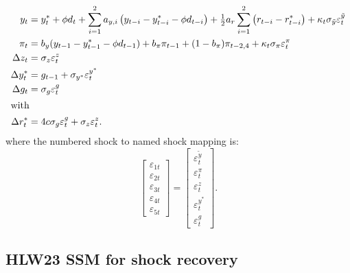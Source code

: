 \documentclass[a4paper,12pt]{article}
\newcommand{\bsq}{\begin{subequations}}\newcommand{\esq}{\end{subequations}}
\newcommand{\intxt}[1]{\intertext{#1}}\newcommand{\BAW}[1]{\begin{adjustwidth}{-#1mm}{-5mm}}\newcommand{\EAW}{\end{adjustwidth}}
\begin{document}
\bsq\label{LW03}%
\begin{align}
y_{t}& =y_{t}^{\ast }+\phi d_{t}+\sum_{i=1}^{2}a_{y,i}\left(
y_{t-i}-y_{t-i}^{\ast }-\phi d_{t-i}\right) +\tfrac{1}{2}a_{r}\sum_{i=1}^{2}%
\left( r_{t-i}-r_{t-i}^{\ast }\right) +\kappa _{t}\sigma _{\tilde{y}%
}\varepsilon _{t}^{\tilde{y}}  \label{LW03a} \\
\pi _{t}& =b_{y}(y_{t-1}-y_{t-1}^{\ast }-\phi d_{t-1})+b_{\pi }\pi
_{t-1}+(1-b_{\pi })\pi _{t-2,4}+\kappa _{t}\sigma _{\pi }\varepsilon
_{t}^{\pi } \\
\Delta z_{t}& =\sigma _{z}\varepsilon _{t}^{z}  \label{LW03c} \\
\Delta y_{t}^{\ast }& =g_{t-1}+\sigma _{y^{\ast }}\varepsilon _{t}^{y^{\ast
}}  \label{LW03d} \\
\Delta g_{t}& =\sigma _{g}\varepsilon _{t}^{g}  \label{LW03e} \\
\intxt{with}\Delta r_{t}^{\ast }& =4c\sigma _{g}\varepsilon _{t}^{g}+\sigma
_{z}\varepsilon _{t}^{z}.  \label{LW03f}
\end{align}%
\esq where the numbered shock to named shock mapping is:%
\begin{equation}
\begin{bmatrix}
\varepsilon _{1t} \\ 
\varepsilon _{2t} \\ 
\varepsilon _{3t} \\ 
\varepsilon _{4t} \\ 
\varepsilon _{5t}%
\end{bmatrix}%
=%
\begin{bmatrix}
\varepsilon _{t}^{\tilde{y}} \\ 
\varepsilon _{t}^{\pi } \\ 
\varepsilon _{t}^{z} \\ 
\varepsilon _{t}^{y^{\ast }} \\ 
\varepsilon _{t}^{g}%
\end{bmatrix}%
.
\end{equation}

\subsection{HLW23 SSM for shock recovery}
\end{document}
